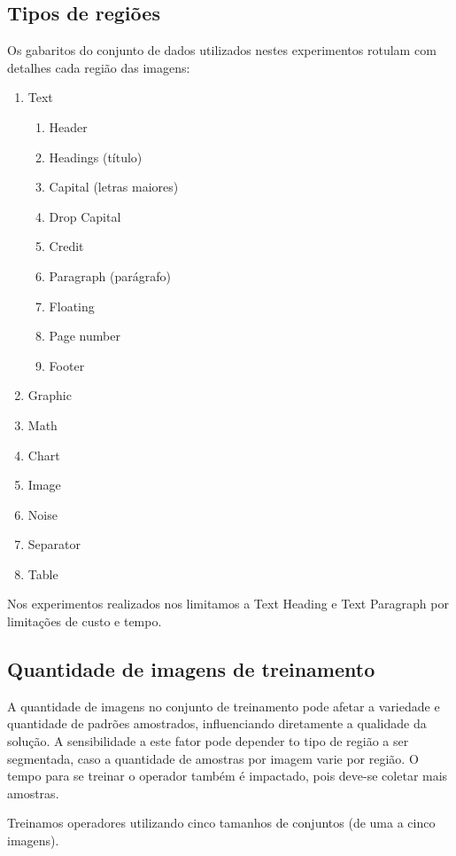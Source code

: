 \documentclass[a4paper,11pt]{article}
\begin{document}
  \subsection{Tipos de regiões}

    Os gabaritos do conjunto de dados utilizados nestes experimentos rotulam com detalhes cada região das imagens:

    \begin{enumerate}
      \item Text
      \begin{enumerate}
        \item Header 
        \item Headings (título)
        \item Capital (letras maiores)
        \item Drop Capital
        \item Credit
        \item Paragraph (parágrafo)
        \item Floating
        \item Page number
        \item Footer
      \end{enumerate}
      \item Graphic
      \item Math
      \item Chart
      \item Image
      \item Noise
      \item Separator
      \item Table
    \end{enumerate}

    Nos experimentos realizados nos limitamos a Text Heading e Text Paragraph por limitações de custo e tempo.

  \subsection{Quantidade de imagens de treinamento}

    A quantidade de imagens no conjunto de treinamento pode afetar a variedade e quantidade de padrões amostrados, influenciando diretamente a qualidade da solução. A sensibilidade a este fator pode depender to tipo de região a ser segmentada, caso a quantidade de amostras por imagem varie por região. O tempo para se treinar o operador também é impactado, pois deve-se coletar mais amostras.

    Treinamos operadores utilizando cinco tamanhos de conjuntos (de uma a cinco imagens).
\end{document}
